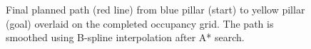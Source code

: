 \documentclass{article}
\begin{document}
\begin{figure}[H]
    \centering
    \caption{Final planned path (red line) from blue pillar (start) to yellow pillar (goal) overlaid on the completed occupancy grid. The path is smoothed using B-spline interpolation after A* search.}
    \label{fig:final_path}
\end{figure}
\end{document}
